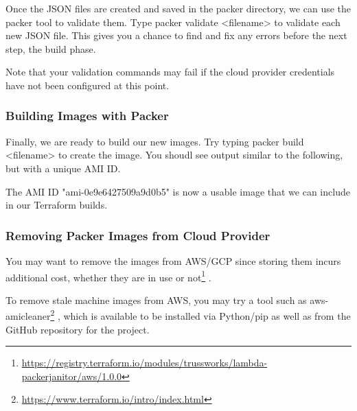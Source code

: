 Once the JSON files are created and saved in the packer directory, we
can use the packer tool to validate them. Type
packer validate \textless{}filename\textgreater{} to validate each new
JSON file. This gives you a chance to find and fix any errors before the
next step, the build phase.

Note that your validation commands may fail if the cloud provider
credentials have not been configured at this point.

\hypertarget{building-images-with-packer}{%
   \subsubsection{Building Images with
      Packer}\label{building-images-with-packer}}

Finally, we are ready to build our new images. Try typing
packer build \textless{}filename\textgreater{} to create the image. You
shoudl see output similar to the following, but with a unique AMI ID.

\begin{Shaded}
   \begin{Highlighting}[]
       

      \NormalTok{==}\OperatorTok{>} 
      \ExtensionTok{--}\OperatorTok{>}
   \end{Highlighting}
\end{Shaded}

The AMI ID "ami-0e9e6427509a9d0b5" is now a usable image that we can
include in our Terraform builds.

\hypertarget{removing-packer-images-from-cloud-provider}{%
   \subsubsection{Removing Packer Images from Cloud
      Provider}\label{removing-packer-images-from-cloud-provider}}

You may want to remove the images from AWS/GCP since storing them incurs
additional cost, whether they are in use or not\footnote{\url{https://registry.terraform.io/modules/trussworks/lambda-packerjanitor/aws/1.0.0}}
.

To remove stale machine images from AWS, you may try a tool such as
aws-amicleaner\footnote{\url{https://www.terraform.io/intro/index.html}}
, which is available to be installed via Python/pip as well as from the
GitHub repository for the project.

